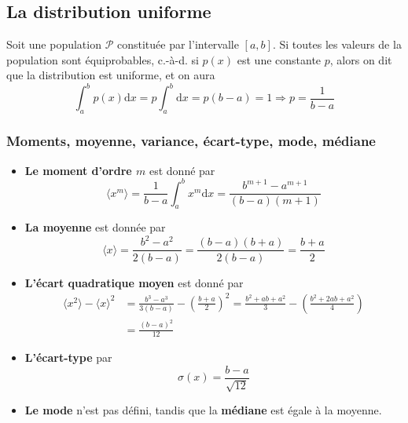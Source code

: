 \documentclass[main.tex]{subfiles}
\begin{document}
\subsection{La distribution uniforme}

Soit une population $\mathcal{P}$ constituée par l'intervalle $[a,b]$. Si toutes les valeurs de la population sont équiprobables, c.-à-d. si $p(x)$ est une constante $p$, alors on dit que la distribution est uniforme, et on aura
\begin{equation}
    \int_a^b p(x)\text{d}x=p\int_a^b\text{d}x=p(b-a)=1\Longrightarrow p=\frac{1}{b-a}
\end{equation}

\subsubsection{Moments, moyenne, variance, écart-type, mode, médiane}

\begin{itemize}
    \item \textbf{Le moment d'ordre $m$} est donné par
          \begin{equation}
              \langle x^m\rangle=\frac{1}{b-a}\int_a^b x^m\text{d}x=
              \frac{b^{m+1}-a^{m+1}}{(b-a)(m+1)}
          \end{equation}
    \item \textbf{La moyenne} est donnée par
          \begin{equation}
              \langle x\rangle=\frac{b^2-a^2}{2(b-a)}=\frac{(b-a)(b+a)}{2(b-a)}=\frac{b+a}{2}
          \end{equation}
    \item \textbf{L'écart quadratique moyen} est donné par
          \begin{align}
              \langle x^2\rangle-\langle x\rangle^2 & =\frac{b^3-a^3}{3(b-a)}-\left(\frac{b+a}{2}\right)^2=\frac{b^2+ab+a^2}{3}-\left(\frac{b^2+2ab+a^2}{4}\right)\nonumber \\
                                                    & =\frac{(b-a)^2}{12}
          \end{align}
    \item \textbf{L'écart-type} par
          \begin{equation}
              \sigma(x)=\frac{b-a}{\sqrt{12}}
          \end{equation}
    \item \textbf{Le mode} n'est pas défini, tandis que la \textbf{médiane} est égale à la moyenne.
\end{itemize}
\end{document}
